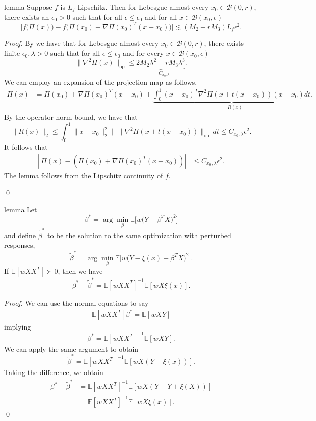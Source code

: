 \documentclass[11pt]{article}
\begin{document}
\begin{restatable}[Approximation]{lemma}{} \label{lemma: proj approx}
    Suppose $f$ is $L_f$-Lipschitz. Then for Lebesgue almost every $x_0 \in \mathcal{B}(0,r)$, there exists an $\epsilon_0 > 0$ such that for all $\epsilon \leq \epsilon_0$ and for all $x \in \mathcal{B}(x_0, \epsilon)$
    \[\bigg|f\big(\Pi(x)\big) - f\big(\Pi(x_0) + \nabla\Pi(x_0)^{T}(x-x_0) \big)\bigg| \lesssim (M_2+rM_3)L_f\epsilon^2. \]
\end{restatable}

\noindent \textit{Proof.} By  we have that for Lebesgue almost every $x_0 \in \mathcal{B}(0,r)$, there exists finite $\epsilon_0, \lambda > 0$ such that for all $\epsilon \leq \epsilon_0$ and for every $x \in \mathcal{B}(x_0, \epsilon)$
\[\|\nabla^2\Pi(x)\|_{\text{op}} \leq \underbrace{2M_2\lambda^{2}+rM_3\lambda^{3}}_{= C_{x_0, \lambda}}.\]
We can employ an expansion of the projection map as follows,
\begin{align*}
    \Pi(x) &= \Pi(x_0) + \nabla\Pi(x_0)^{T}(x-x_0) + \underbrace{\int_{0}^{1}(x-x_0)^T\nabla^2\Pi(x+t(x-x_0))(x-x_0) dt}_{= R(x)}.
\end{align*}
By the operator norm bound, we have that
\[\|R(x)\|_2 \leq \int_{0}^{1}\|x - x_0\|_2^2\|\|\nabla^2\Pi(x+t(x-x_0))\|_{\text{op}} \,dt \leq C_{x_0, \lambda}\epsilon^2.\]
It follows that 
\begin{align}
    \left|\,\Pi(x) - \left(\Pi(x_0) + \nabla\Pi(x_0)^{T}(x-x_0)\right)\right| &\leq C_{x_0, \lambda}\epsilon^2.
\end{align}
The lemma follows from the Lipschitz continuity of $f$. 

\qed{}


\begin{restatable}[Perturbation]{lemma}{} \label{lemma: perturbation}
    Let 
    \[\beta^* = \arg\min_{\beta}\mathbb{E}\big[w\big(Y - \beta^{T}X\big)^2\big]\]
    and define $\tilde{\beta}^*$ to be the solution to the same optimization with perturbed responses,
    \[\tilde{\beta}^* = \arg\min_{\beta}\mathbb{E}\big[w\big(Y - \xi(x) - \beta^{T}X\big)^2\big].\]
    If $\mathbb{E}[wXX^T] \succ 0$, then we have
    \[\beta^* - \tilde{\beta}^* = \mathbb{E}[wXX^{T}]^{-1}\mathbb{E}[wX\xi(x)].\]
\end{restatable}
\noindent \textit{Proof.} We can use the normal equations to say
\begin{align*}
    \mathbb{E}[wXX^{T}]\beta^* = \mathbb{E}[wXY]
\end{align*}
implying 
\[\beta^* = \mathbb{E}[wXX^{T}]^{-1}\mathbb{E}[wXY].\]
We can apply the same argument to obtain 
\[\tilde{\beta}^* = \mathbb{E}[wXX^{T}]^{-1}\mathbb{E}[wX(Y - \xi(x))].\]
Taking the difference, we obtain
\begin{align*}
    \beta^* - \tilde{\beta}^* &= \mathbb{E}[wXX^{T}]^{-1}\mathbb{E}[wX(Y -  Y + \xi(X) )] \\
    &= \mathbb{E}[wXX^{T}]^{-1}\mathbb{E}[wX\xi(x)].
\end{align*}
\qed{}
\end{document}

